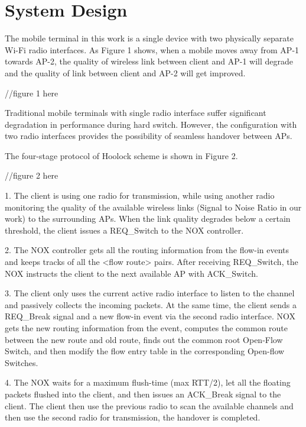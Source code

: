\section{System Design}

The mobile terminal in this work is a single device with two physically separate Wi-Fi radio interfaces. As Figure 1 shows, when a mobile moves away from AP-1 towards AP-2, the quality of wireless link between client and AP-1 will degrade and the quality of link between client and AP-2 will get improved.

//figure 1 here

Traditional mobile terminals with single radio interface suffer significant degradation in performance during hard switch. However, the configuration with two radio interfaces provides the possibility of seamless handover between APs.

The four-stage protocol of Hoolock scheme is shown in Figure 2.

//figure 2 here

1. The client is using one radio for transmission, while using another radio monitoring the quality of the available wireless links (Signal to Noise Ratio in our work) to the surrounding APs. When the link quality degrades below a certain threshold, the client issues a REQ_Switch to the NOX controller.

2. The NOX controller gets all the routing information from the flow-in events and keeps tracks of all the <flow route> pairs. After receiving REQ_Switch, the NOX instructs the client to the next available AP with ACK_Switch.

3. The client only uses the current active radio interface to listen to the channel and passively collects the incoming packets. At the same time, the client sends a REQ_Break signal and a new flow-in event via the second radio interface. NOX gets the new routing information from the event, computes the common route between the new route and old route, finds out the common root Open-Flow Switch, and then modify the flow entry table in the corresponding Open-flow Switches.

4. The NOX waits for a maximum flush-time (max RTT/2), let all the floating packets flushed into the client, and then issues an ACK_Break signal to the client. The client then use the previous radio to scan the available channels and then use the second radio for transmission, the handover is completed.


